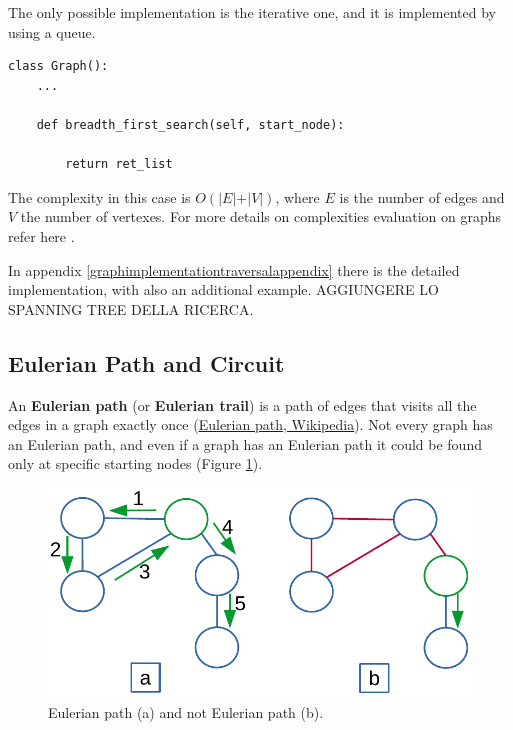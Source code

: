 The only possible implementation is the iterative one, and it is implemented by using a queue.

\begin{lstlisting}[firstnumber=1, caption={Recursive implementation of a depth-first search.}]
class Graph():
	...
	
	def breadth_first_search(self, start_node):
		
		return ret_list
\end{lstlisting}

The complexity in this case is \(O(\vert E \vert + \vert V \vert)\), where \(E\) is the number of edges and \(V\) the number of vertexes. For more details on complexities evaluation on graphs refer here \cite{goodrich2013data}.

In appendix \ref{graphimplementationtraversalappendix} there is the detailed implementation, with also an additional example.
AGGIUNGERE LO SPANNING TREE DELLA RICERCA.
\subsection{Eulerian Path and Circuit}
An \textbf{Eulerian path} (or \textbf{Eulerian trail}) is a path of edges that visits all the edges in a graph exactly once \cite{wikieulerianpathcircuit} (\href{https://en.wikipedia.org/wiki/Eulerian_path}{Eulerian path, Wikipedia}). Not every graph has an Eulerian path, and even if a graph has an Eulerian path it could be found only at specific starting nodes (Figure \ref{graphs_8}).

\begin{figure}[H]
	\begin{center}
		\includegraphics[scale=.6]{chapters/graphs/images/graphs_8.pdf}
		\caption[Eulerian path (a) and not Eulerian path (b).]{Eulerian path (a) and not Eulerian path (b).}
		\label{graphs_8}
	\end{center}
\end{figure}

